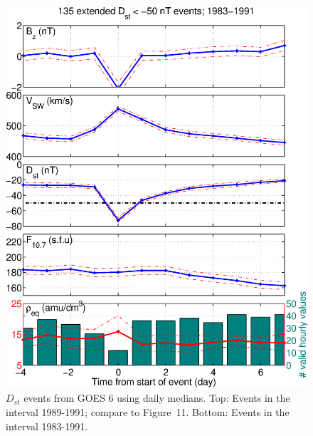 \documentclass[12pt]{article}
\providecommand{\DIFaddbeginFL}{} %
\providecommand{\DIFaddendFL}{} %
\providecommand{\DIFdelendFL}{} %
\begin{document}
\begin{figure}[h]
\DIFdelendFL \DIFaddbeginFL \includegraphics[scale=0.40]{UsedFigures/2016SW001507R-p03b.eps}
\DIFaddendFL \caption{$D_{st}$ events from GOES 6 using daily medians. Top: Events in the interval 1989-1991; compare to \cite{Takahashi2010} Figure~11. Bottom: Events in the interval 1983-1991.}
\label{fig:DailyAveragedDstEvents}
\end{figure}

\clearpage
\end{document}
